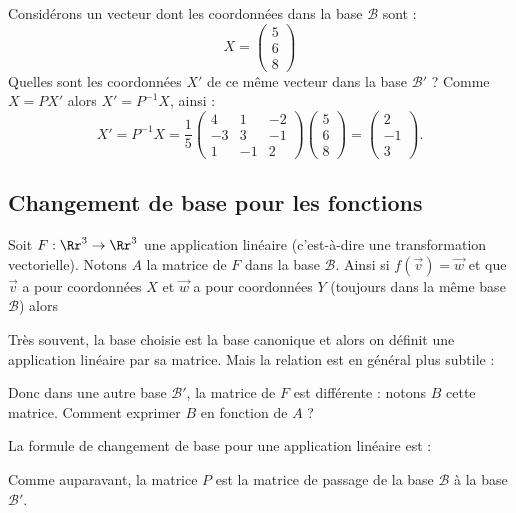 \documentclass[11pt,class=report,crop=false]{standalone}
\begin{document}
\begin{exemple}
Considérons un vecteur dont les coordonnées dans la base $\mathcal{B}$ sont :
$$X = \begin{pmatrix}5\\6\\8\end{pmatrix}$$
Quelles sont les coordonnées $X'$ de ce même vecteur dans la base $\mathcal{B}'$ ?
Comme $X = PX'$ alors $X' = P^{-1}X$, ainsi :
$$X' = P^{-1} X = 
\frac15 
\begin{pmatrix}
	4 & 1 & -2 \\
	-3 & 3 & -1 \\
	1 & -1 & 2	
\end{pmatrix}
\begin{pmatrix}5\\6\\8\end{pmatrix}
= \begin{pmatrix}2\\-1\\3\end{pmatrix}.
$$
\end{exemple}



\subsection{Changement de base pour les fonctions}

Soit $F : \Rr^3 \to \Rr^3$ une application linéaire (c'est-à-dire une transformation vectorielle). Notons $A$ la matrice de $F$ dans la base $\mathcal{B}$.
Ainsi si $f(\vec v) = \vec w$ et que $\vec v$ a pour coordonnées $X$ et $\vec w$ a pour coordonnées $Y$ (toujours dans la même base $\mathcal{B}$) alors


Très souvent, la base choisie est la base canonique et alors on définit une application linéaire par sa matrice. 
Mais la relation est en général plus subtile :

Donc dans une autre base $\mathcal{B}'$, la matrice de $F$ est différente : notons $B$ cette matrice.
Comment exprimer $B$ en fonction de $A$ ? 

La formule de changement de base pour une application linéaire est :
\begin{proposition}
\sauteligne
{}
\end{proposition}
Comme auparavant, la matrice $P$ est la matrice de passage de la base $\mathcal{B}$ à la base $\mathcal{B}'$.
\end{document}
